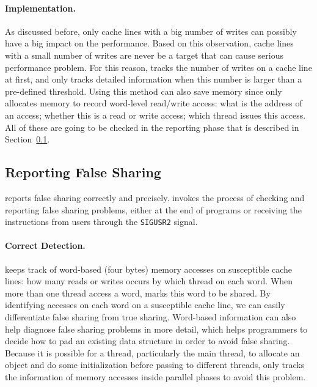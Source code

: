 \paragraph{Implementation.} 
As discussed before, only cache lines with a big number of writes can possibly have a big impact on the performance. Based on this observation, cache lines with a small number of writes are never be a target that can cause serious performance problem. For this reason, \Cheetah{} tracks the number of writes on a cache line at first, and only tracks detailed information when this number is larger than a pre-defined threshold. Using this method can also save memory since \cheetah{} only allocates memory to record word-level read/write access: what is the address of an access; whether this is a read or write access; which thread issues this access. All of these are going to be checked in the reporting phase that is described in Section~\ref{sec:report}. 

 \subsection{Reporting False Sharing}
\label{sec:report}

\Cheetah{} reports false sharing correctly and precisely. \Cheetah{} invokes the process of checking and reporting false sharing problems, either at the end of programs or receiving the instructions from users through the \texttt{SIGUSR2} signal.  

\paragraph{Correct Detection.} \Cheetah{} keeps track of word-based (four bytes) memory accesses on susceptible cache lines: how many reads or writes occurs by which thread on each word. When more than one thread access a word, \Cheetah{} marks this word to be shared. By identifying accesses on each word on a susceptible cache line, we can easily differentiate false sharing from true sharing. Word-based information can also help diagnose false sharing problems in more detail, which helps programmers to decide how to pad an existing data structure in order to avoid false sharing. Because it is possible for a thread, particularly the main thread, to allocate an object and do some initialization before passing to different threads, \cheetah{} only tracks the information of memory accesses inside parallel phases to avoid this problem.

